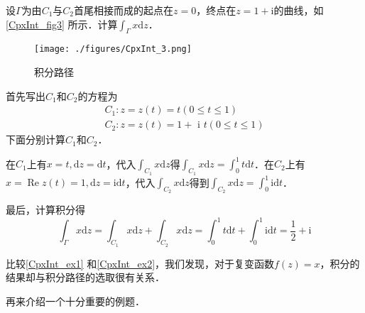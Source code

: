 \begin{example}{} \label{CpxInt_ex2}
设$\Gamma$为由$C_1$与$C_2$首尾相接而成的起点在$z=0$，终点在$ z =1+ \mathrm i $的曲线，如\autoref{CpxInt_fig3} 所示．计算$\displaystyle \int_{\Gamma} x \mathrm{d}z$．
\begin{figure}[ht]
\centering
\texttt{[image: ./figures/CpxInt\_3.png]}
\caption{积分路径} \label{CpxInt_fig3}
\end{figure}

首先写出$C_1$和$C_2$的方程为
\begin{equation}
\begin{array}{l}C_{1}: z=z(t)=t(0 \leqslant t \leqslant 1) \\ C_{2}: z=z(t)=1+\text { i }t(0 \leqslant t \leqslant 1)\end{array}
\end{equation}
下面分别计算$C_1$和$C_2$．

在$C_1$上有$x=t, \mathrm{d} z=\mathrm{d} t$，代入$\displaystyle \int_{C_{1}} x \mathrm{d} z$得$\displaystyle \int_{C_{1}} x \mathrm{d} z=\int_{0}^{1} t \mathrm{d} t$．在$C_2$上有$\displaystyle x=\operatorname{Re} z(t)=1, \mathrm{d} z=\mathrm{id} t$，代入$\displaystyle \int_{C_{2}} x \mathrm{d} z$得到$\displaystyle \int_{C_{2}} x \mathrm{d} z=\int_{0}^{1} \mathrm{id} t$．

最后，计算积分得
\begin{equation}
\int_{\Gamma} x \mathrm{d} z=\int_{C_{1}} x \mathrm{d} z+\int_{C_{2}} x \mathrm{d} z=\int_{0}^{1} t \mathrm{d} t+\int_{0}^{1} \mathrm{i} \mathrm{d} t=\frac{1}{2}+\mathrm{i}
\end{equation}
\end{example}

比较\autoref{CpxInt_ex1} 和\autoref{CpxInt_ex2}，我们发现，对于复变函数$f(z)=x$，积分的结果却与积分路径的选取很有关系．

再来介绍一个十分重要的例题．

